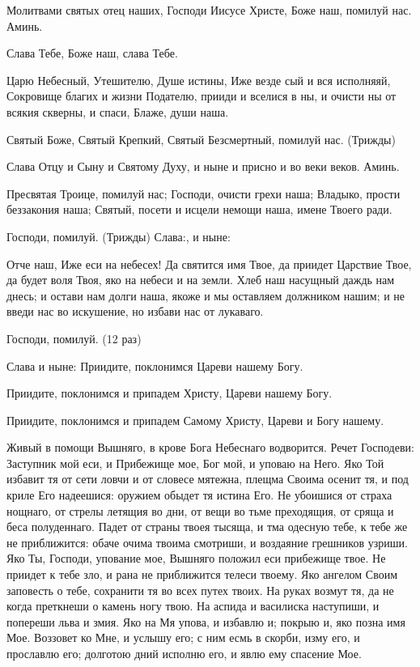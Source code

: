 \begin{mymulticols}
 


Молитвами святых отец наших, Господи Иисусе Христе, Боже наш, помилуй нас. Аминь. 

Слава Тебе, Боже наш, слава Тебе. 

Царю Небесный, Утешителю, Душе истины, Иже везде сый и вся исполняяй, Сокровище благих и жизни Подателю, прииди и вселися в ны, и очисти ны от всякия скверны, и спаси, Блаже, души наша. 

Святый Боже, Святый Крепкий, Святый Безсмертный, помилуй нас. (Трижды) 

Слава Отцу и Сыну и Святому Духу, и ныне и присно и во веки веков. Аминь. 

Пресвятая Троице, помилуй нас; Господи, очисти грехи наша; Владыко, прости беззакония наша; Святый, посети и исцели немощи наша, имене Твоего ради. 

Господи, помилуй. (Трижды) Слава:, и ныне: 

Отче наш, Иже еси на небесех! Да святится имя Твое, да приидет Царствие Твое, да будет воля Твоя, яко на небеси и на земли. Хлеб наш насущный даждь нам днесь; и остави нам долги наша, якоже и мы оставляем должником нашим; и не введи нас во искушение, но избави нас от лукаваго. 

Господи, помилуй. (12 раз) 

Слава и ныне: Приидите, поклонимся Цареви нашему Богу. 

Приидите, поклонимся и припадем Христу, Цареви нашему Богу. 

Приидите, поклонимся и припадем Самому Христу, Цареви и Богу нашему.




Живый в помощи Вышняго, в крове Бога Небеснаго водворится. Речет Господеви: Заступник мой еси, и Прибежище мое, Бог мой, и уповаю на Него. Яко Той избавит тя от сети ловчи и от словесе мятежна, плещма Своима осенит тя, и под криле Его надеешися: оружием обыдет тя истина Его. Не убоишися от страха нощнаго, от стрелы летящия во дни, от вещи во тьме преходящия, от сряща и беса полуденнаго. Падет от страны твоея тысяща, и тма одесную тебе, к тебе же не приближится: обаче очима твоима смотриши, и воздаяние грешников узриши. Яко Ты, Господи, упование мое, Вышняго положил еси прибежище твое. Не приидет к тебе зло, и рана не приближится телеси твоему. Яко ангелом Своим заповесть о тебе, сохранити тя во всех путех твоих. На руках возмут тя, да не когда преткнеши о камень ногу твою. На аспида и василиска наступиши, и попереши льва и змия. Яко на Мя упова, и избавлю и; покрыю и, яко позна имя Мое. Воззовет ко Мне, и услышу его; с ним есмь в скорби, изму его, и прославлю его; долготою дний исполню его, и явлю ему спасение Мое. 


\end{mymulticols}
